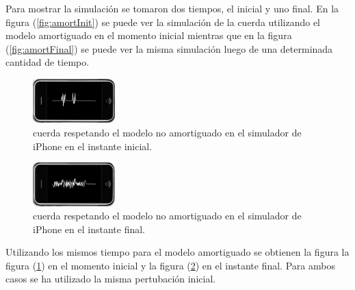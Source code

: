 \documentclass[11pt,a4paper]{emulateapj}
\begin{document}
Para mostrar la simulación se tomaron dos tiempos, el inicial y uno final. En la figura (\ref{fig:amortInit}) se puede ver la simulación de la cuerda utilizando el modelo amortiguado en el momento inicial mientras que en la figura (\ref{fig:amortFinal}) se puede ver la misma simulación luego de una determinada cantidad de tiempo.

\begin{figure}[ht!]
     \includegraphics[width=120px]{images/sinamortInit.png}
      \caption{cuerda respetando el modelo no amortiguado en el simulador de iPhone en el instante inicial.}
     \label{fig:sinamortInit}
\end{figure}
\begin{figure}[ht!]
     \includegraphics[width=120px]{images/sinamortFinal.png}
      \caption{cuerda respetando el modelo no amortiguado en el simulador de iPhone en el instante final.}
     \label{fig:sinamortFinal}
\end{figure}

Utilizando los mismos tiempo para el modelo amortiguado se obtienen la figura la figura (\ref{fig:sinamortInit}) en el momento inicial y la figura (\ref{fig:sinamortFinal}) en el instante final.  Para ambos casos se ha utilizado la misma pertubación inicial.
 

%
%

\end{document}
